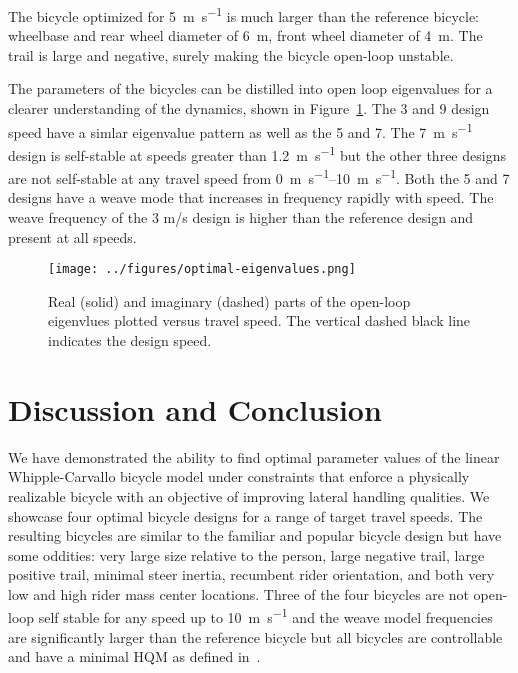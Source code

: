 \documentclass{bmd2019p}
\begin{document}
The bicycle optimized for 5~\si{\meter\per\second} is much larger than the
reference bicycle: wheelbase and rear wheel diameter of 6~\si{\meter}, front
wheel diameter of 4~\si{\meter}. The trail is large and negative, surely making
the bicycle open-loop unstable.

The parameters of the bicycles can be distilled into open loop eigenvalues for
a clearer understanding of the dynamics, shown in
Figure~\ref{fig:optimal-eigenvalues}. The 3 and 9 design speed have a simlar
eigenvalue pattern as well as the 5 and 7. The 7~\si{\meter\per\second} design
is self-stable at speeds greater than 1.2~\si{\meter\per\second} but the other
three designs are not self-stable at any travel speed from
\SIrange{0}{10}{\meter\per\second}. Both the 5 and 7 designs have a weave mode
that increases in frequency rapidly with speed. The weave frequency of the 3
m/s design is higher than the reference design and present at all speeds.
%
\begin{figure}
  \centering
  \texttt{[image: ../figures/optimal-eigenvalues.png]}
  \label{fig:optimal-eigenvalues}
  \caption{Real (solid) and imaginary (dashed) parts of the open-loop eigenvlues plotted versus
    travel speed. The vertical dashed black line indicates the design speed.}
\end{figure}

\section{Discussion and Conclusion}
%
We have demonstrated the ability to find optimal parameter values of the linear
Whipple-Carvallo bicycle model under constraints that enforce a physically
realizable bicycle with an objective of improving lateral handling qualities.
We showcase four optimal bicycle designs for a range of target travel speeds.
The resulting bicycles are similar to the familiar and popular bicycle design
but have some oddities: very large size relative to the person, large negative
trail, large positive trail, minimal steer inertia, recumbent rider
orientation, and both very low and high rider mass center locations. Three of
the four bicycles are not open-loop self stable for any speed up to
10~\si{\meter\per\second} and the weave model frequencies are significantly
larger than the reference bicycle but all bicycles are controllable and have a
minimal HQM as defined in~\cite{Hess2012}.
\end{document}
